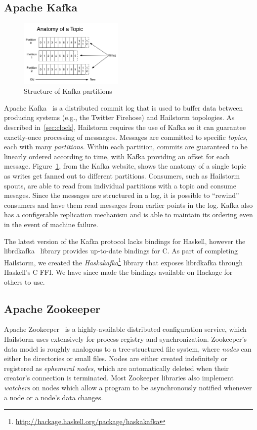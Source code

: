 \documentclass[10pt,nocopyrightspace]{sigplanconf}
\begin{document}
\subsection{Apache Kafka}
\begin{figure}
  \includegraphics[width=0.45\textwidth]{images/kafka_log.png}
  \caption{Structure of Kafka partitions}\label{fig:kafka}
\end{figure}
Apache Kafka~\cite{kafka} is a distributed commit log that is used to buffer data between
producing systems (e.g., the Twitter Firehose) and Hailstorm topologies. As
described in~\ref{sec:clock}, Hailstorm requires the use of Kafka so it can
guarantee exactly-once processing of messaages. Messages are committed to
specific \textit{topics}, each with many \textit{partitions}. Within each
partition, commits are guaranteed to be linearly ordered according to time, with
Kafka providing an offset for each message. Figure~\ref{fig:kafka}, from the
Kafka website, shows the anatomy of a single topic as writes get fanned out to
different partitions. Consumers, such as Hailstorm spouts, are able to read from
individual partitions with a topic and consume mesages. Since the messages are
structured in a log, it is possible to ``rewind'' consumers and have them read
messages from earlier points in the log. Kafka also has a configerable replication
mechanism and is able to maintain its ordering even in the event of machine failure.

The latest version of the Kafka protocol lacks bindings for Haskell, however the
librdkafka~\cite{rdkafka} library provides up-to-date bindings for C. As part
of completing Hailstorm, we created the \textit{Haskakafka}\footnote{%
\url{http://hackage.haskell.org/package/haskakafka}} library that exposes
librdkafka through Haskell's C FFI\@. We have since made the bindings available on
Hackage for others to use.


\subsection{Apache Zookeeper}
\label{sec:zookeeper}
Apache Zookeeper~\cite{zookeeper} is a highly-available distributed
configuration service, which Hailstorm uses extensively for process
registry and synchronization. Zookeeper's data model is roughly analogous
to a tree-structured file system, where \textit{nodes} can either be
directories or small files. Nodes are either created indefinitely
or registered as \textit{ephemeral nodes}, which are automatically
deleted when their creator's connection is terminated. Most Zookeeper
libraries also implement \textit{watchers} on nodes which allow a program to be
asynchronously notified whenever a node or a node's data changes.
\end{document}
